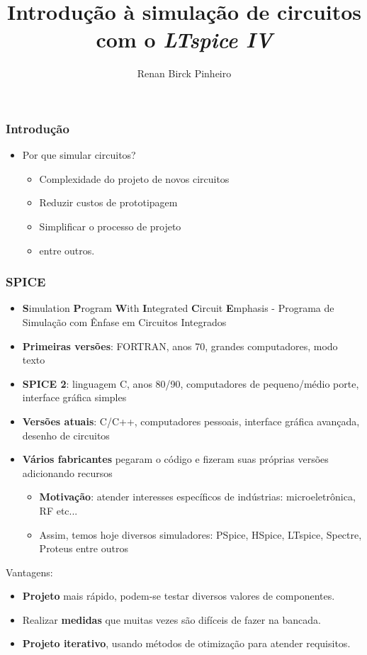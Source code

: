 \documentclass{beamer}
\title{Introdução à simulação de circuitos com o \textit{LTspice IV}}
\author{Renan Birck Pinheiro}
\institute{Universidade Federal de Santa Maria}
\begin{document}
\begin{frame}
\titlepage
\end{frame}

\begin{frame} %
\frametitle{Introdução}
\begin{itemize}
\item{Por que simular circuitos?}
\begin{itemize}
\pause
\item{Complexidade do projeto de novos circuitos}
\pause
\item{Reduzir custos de prototipagem}
\pause
\item{Simplificar o processo de projeto}
\pause
\item{entre outros.}
\end{itemize}
\end{itemize}
\end{frame} %


\begin{frame} %
\frametitle{SPICE}
\begin{itemize}
\item{\textbf{S}imulation \textbf{P}rogram \textbf{W}ith \textbf{I}ntegrated \textbf{C}ircuit \textbf{E}mphasis - Programa de Simulação com Ênfase em Circuitos Integrados}
\item{\textbf{Primeiras versões}: FORTRAN, anos 70, grandes computadores, modo texto}
\item{\textbf{SPICE 2}: linguagem C, anos 80/90, computadores de pequeno/médio porte, interface gráfica simples}
\item{\textbf{Versões atuais}: C/C++, computadores pessoais, interface gráfica avançada, desenho de circuitos}
\pause
\item{\textbf{Vários fabricantes} pegaram o código e fizeram suas próprias versões adicionando recursos}
\begin{itemize}
\item{\textbf{Motivação}: atender interesses específicos de indústrias: microeletrônica, RF etc...}
\item{Assim, temos hoje diversos simuladores: PSpice, HSpice, LTspice, Spectre, Proteus entre outros}
\end{itemize}
\end{itemize}
\end{frame} %



\begin{frame} %
Vantagens:
\begin{itemize}
\item{\textbf{Projeto}} mais rápido, podem-se testar diversos valores de componentes.
\item{Realizar \textbf{medidas}} que muitas vezes são difíceis de fazer na bancada.
\item{\textbf{Projeto iterativo}}, usando métodos de otimização para atender requisitos.
\end{itemize}

\end{frame} %
\end{document}
